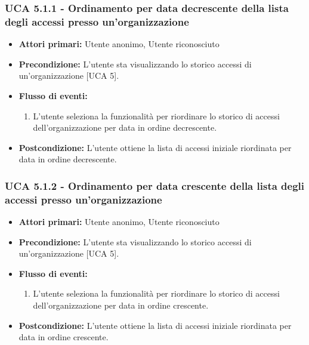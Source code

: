 \subsubsection{UCA 5.1.1 - Ordinamento per data decrescente della lista degli accessi presso un'organizzazione}
\begin{itemize}
    \item \textbf{Attori primari:} Utente anonimo, Utente riconosciuto
    \item \textbf{Precondizione:} L'utente sta visualizzando lo storico accessi di un'organizzazione [UCA 5].
    \item \textbf{Flusso di eventi:}
    \begin{enumerate}
        \item L'utente seleziona la funzionalità per riordinare lo storico di accessi dell'organizzazione per data in ordine decrescente.
    \end{enumerate}
    \item \textbf{Postcondizione:} L'utente ottiene la lista di accessi iniziale riordinata per data in ordine decrescente.
\end{itemize}

\subsubsection{UCA 5.1.2 - Ordinamento per data crescente della lista degli accessi presso un'organizzazione}
\begin{itemize}
    \item \textbf{Attori primari:} Utente anonimo, Utente riconosciuto
    \item \textbf{Precondizione:} L'utente sta visualizzando lo storico accessi di un'organizzazione [UCA 5].
    \item \textbf{Flusso di eventi:}
    \begin{enumerate}
        \item L'utente seleziona la funzionalità per riordinare lo storico di accessi dell'organizzazione per data in ordine crescente.
    \end{enumerate}
    \item \textbf{Postcondizione:} L'utente ottiene la lista di accessi iniziale riordinata per data in ordine crescente.
\end{itemize}

